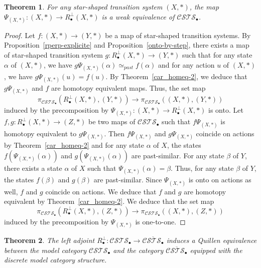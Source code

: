 \documentclass[a4paper,12pt]{amsart}
\newtheorem{thm}{Theorem}[section]
\begin{document}
\begin{thm} \label{loc-red} For any star-shaped transition system $(X,*)$, the map
$\Psi_{(X,*)}:(X,*) \to R_\bullet^\perp(X,*)$ is a weak equivalence of
${\mathcal{C\!S\!T\!S}}_\bullet$. \end{thm}

\begin{proof} Let $f:(X,*) \to (Y,*)$ be a map of star-shaped transition
systems.  By Proposition~\ref{rperp-explicite} and
Proposition~\ref{onto-by-step}, there exists a map of star-shaped
transition system $g:R_\bullet^\perp(X,*) \to (Y,*)$ such that for any state
$\alpha$ of $(X,*)$, we have $g\Psi_{(X,*)}(\alpha) \simeq_{past}
f(\alpha)$ and for any action $u$ of $(X,*)$, we have
$g\Psi_{(X,*)}(u) = f(u)$.  By Theorem~\ref{car_homeq-2}, we deduce
that $g\Psi_{(X,*)}$ and $f$ are homotopy equivalent maps.  Thus, the
set map \[\pi_{{\mathcal{C\!S\!T\!S}}_\bullet}(R_\bullet^\perp(X,*),(Y,*)) \to
\pi_{{\mathcal{C\!S\!T\!S}}_\bullet}((X,*),(Y,*))\] induced by the precomposition by
$\Psi_{(X,*)}:(X,*) \to R_\bullet^\perp(X,*)$ is onto.  Let
$f,g:R_\bullet^\perp(X,*)\to (Z,*)$ be two maps of ${\mathcal{C\!S\!T\!S}}_\bullet$ such that
$f\Psi_{(X,*)}$ is homotopy equivalent to $g\Psi_{(X,*)}$. Then
$f\Psi_{(X,*)}$ and $g\Psi_{(X,*)}$ coincide on actions by
Theorem~\ref{car_homeq-2} and for any state $\alpha$ of $X$, the
states $f(\Psi_{(X,*)}(\alpha))$ and $g(\Psi_{(X,*)}(\alpha))$ are
past-similar.  For any state $\beta$ of $Y$, there exists a state
$\alpha$ of $X$ such that $\Psi_{(X,*)}(\alpha)=\beta$. Thus, for any
state $\beta$ of $Y$, the states $f(\beta)$ and $g(\beta)$ are
past-similar. Since $\Psi_{(X,*)}$ is onto on actions as well, $f$ and
$g$ coincide on actions.  We deduce that $f$ and $g$ are homotopy
equivalent by Theorem~\ref{car_homeq-2}. We deduce that the set map
\[\pi_{{\mathcal{C\!S\!T\!S}}_\bullet}(R_\bullet^\perp(X,*),(Z,*)) \to
\pi_{{\mathcal{C\!S\!T\!S}}_\bullet}((X,*),(Z,*))\] induced by the precomposition by $\Psi_{(X,*)}$
is one-to-one.
\end{proof}

\begin{thm} \label{carac-bullet} The left adjoint $R_\bullet^\perp:{\mathcal{C\!S\!T\!S}}_\bullet \to
\overline{{\mathcal{C\!S\!T\!S}}_\bullet}$ induces a Quillen equivalence between the
model category ${\mathcal{C\!S\!T\!S}}_\bullet$ and the category
$\overline{{\mathcal{C\!S\!T\!S}}_\bullet}$ equipped with the discrete model category
structure. \end{thm}
\end{document}
